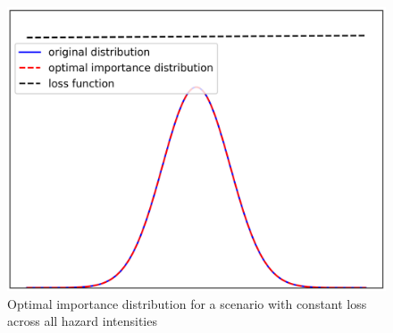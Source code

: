     \begin{figure}[H]
        \centering
        \includegraphics[scale=0.50]{Manuscript/Figures/Images/Methods/optimal_IS_dist_case1.png}
        \caption{Optimal importance distribution for a scenario with constant loss across all hazard intensities}
        \label{fig:optimal_IS_dist_case1}
    \end{figure}